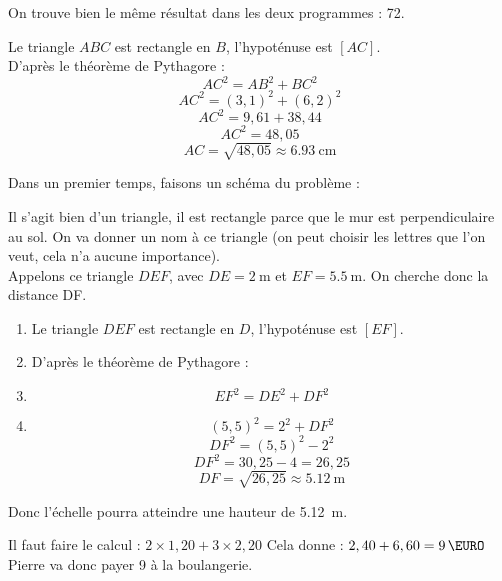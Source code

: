 \documentclass[../Cours.tex]{subfiles}
\begin{document}
\begin{questions}
        On trouve bien le même résultat dans les deux programmes : 72.

        \question Le triangle $ABC$ est rectangle en $B$, l'hypoténuse est $[AC]$.\\
        D'après le théorème de Pythagore :
        $$AC^2 = AB^2 + BC^2$$
        $$AC^2 = (3,1)^2 + (6,2)^2$$
        $$AC^2 = 9,61 + 38,44$$
        $$AC^2 = 48,05$$
        $$AC = \sqrt{48,05} \approx \qty{6,93}{\centi\metre}$$

        \clearpage
        \question 
        Dans un premier temps, faisons un schéma du problème :\\
        \begin{center}
        \end{center}

        Il s'agit bien d'un triangle, il est rectangle parce que le mur est perpendiculaire au sol.
        On va donner un nom à ce triangle (on peut choisir les lettres que l'on veut, cela n'a aucune importance).\\
        Appelons ce triangle $DEF$, avec $DE = \qty{2}{\metre}$ et $EF = \qty{5,5}{\metre}$. On cherche donc la distance DF.\\
        \begin{enumerate}[label=\arabic*)]
            \item Le triangle $DEF$ est rectangle en $D$, l'hypoténuse est $[EF]$.
            \item D'après le théorème de Pythagore :
            \item $$EF^2 = DE^2 + DF^2$$
            \item $$(5,5)^2 = 2^2 + DF^2$$
            $$ DF^2 = (5,5)^2 - 2^2 $$
            $$ DF^2 = 30,25 - 4 = 26,25 $$
            $$ DF = \sqrt{26,25} \approx \qty{5,12}{\metre} $$
        \end{enumerate}

        Donc l'échelle pourra atteindre une hauteur de \qty{5,12}{\metre}.

        \question Il faut faire le calcul : $2 \times 1,20 + 3 \times 2,20$
        \question Cela donne : $2,40 + 6,60 = \qty{9}{\EURO}$
    Pierre va donc payer \qty{9}{\EURO} à la boulangerie.


\end{questions}
\end{document}
